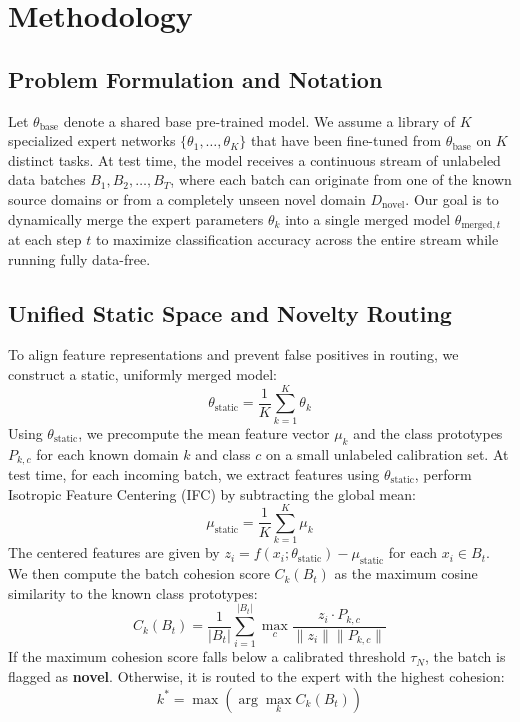\documentclass{article}
\theoremstyle{plain}
\theoremstyle{definition}
\theoremstyle{remark}
\begin{document}
\section{Methodology}
\label{sec:method}

\subsection{Problem Formulation and Notation}
Let $\theta_{\text{base}}$ denote a shared base pre-trained model. We assume a library of $K$ specialized expert networks $\{\theta_1, \dots, \theta_K\}$ that have been fine-tuned from $\theta_{\text{base}}$ on $K$ distinct tasks. At test time, the model receives a continuous stream of unlabeled data batches $B_1, B_2, \dots, B_T$, where each batch can originate from one of the known source domains or from a completely unseen novel domain $D_{\text{novel}}$. Our goal is to dynamically merge the expert parameters $\theta_k$ into a single merged model $\theta_{\text{merged}, t}$ at each step $t$ to maximize classification accuracy across the entire stream while running fully data-free.

\subsection{Unified Static Space and Novelty Routing}
To align feature representations and prevent false positives in routing, we construct a static, uniformly merged model:
\begin{equation}
    \theta_{\text{static}} = \frac{1}{K}\sum_{k=1}^K \theta_k
\end{equation}
Using $\theta_{\text{static}}$, we precompute the mean feature vector $\mu_k$ and the class prototypes $P_{k, c}$ for each known domain $k$ and class $c$ on a small unlabeled calibration set. At test time, for each incoming batch, we extract features using $\theta_{\text{static}}$, perform Isotropic Feature Centering (IFC) by subtracting the global mean:
\begin{equation}
    \mu_{\text{static}} = \frac{1}{K}\sum_{k=1}^K \mu_k
\end{equation}
The centered features are given by $z_i = f(x_i; \theta_{\text{static}}) - \mu_{\text{static}}$ for each $x_i \in B_t$. We then compute the batch cohesion score $C_k(B_t)$ as the maximum cosine similarity to the known class prototypes:
\begin{equation}
\label{eq:cohesion}
    C_k(B_t) = \frac{1}{|B_t|} \sum_{i=1}^{|B_t|} \max_{c} \frac{z_i \cdot P_{k, c}}{\|z_i\| \|P_{k, c}\|}
\end{equation}
If the maximum cohesion score falls below a calibrated threshold $\tau_N$, the batch is flagged as \textbf{novel}. Otherwise, it is routed to the expert with the highest cohesion:
\begin{equation}
    k^* = \max( \arg\max_{k} C_k(B_t) )
\end{equation}
\end{document}
